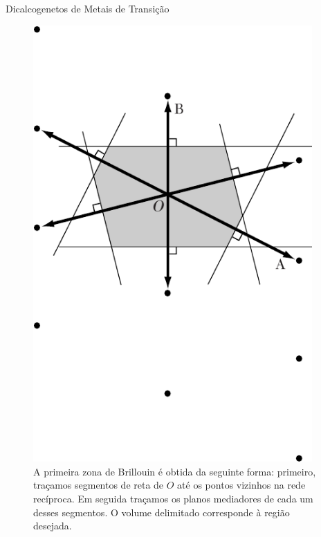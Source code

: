 \begin{frame}{Dicalcogenetos de Metais de Transição}
  \begin{figure}
    \begin{columns}
      \begin{column}{0.35\textwidth}
        \includegraphics[width=\textwidth]{imagens/brillouin.png}
      \end{column}
      \begin{column}{0.65\textwidth}
        \caption{
          A primeira zona de Brillouin é obtida da seguinte forma: primeiro,
          traçamos segmentos de reta de $O$ até os pontos vizinhos na rede
          recíproca. Em seguida traçamos os planos mediadores de cada um desses
          segmentos. O volume delimitado corresponde à região desejada.
        }
      \end{column}
    \end{columns}
  \end{figure}
\end{frame}

